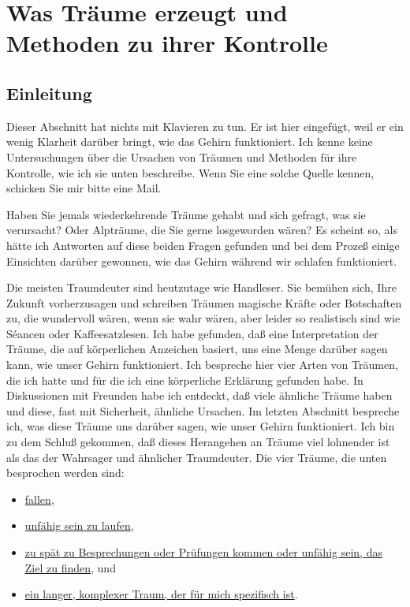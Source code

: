 
\section{Was Träume erzeugt und Methoden zu ihrer Kontrolle}
\label{c3_5}

\subsection{Einleitung}
\label{c3_5a}

Dieser Abschnitt hat nichts mit Klavieren zu tun.
Er ist hier eingefügt, weil er ein wenig Klarheit darüber bringt, wie das Gehirn funktioniert.
Ich kenne keine Untersuchungen über die Ursachen von Träumen und Methoden für ihre Kontrolle, wie ich sie unten beschreibe.
Wenn Sie eine solche Quelle kennen, schicken Sie mir bitte eine Mail.

Haben Sie jemals wiederkehrende Träume gehabt und sich gefragt, was sie verursacht?
Oder Alpträume, die Sie gerne losgeworden wären?
Es scheint so, als hätte ich Antworten auf diese beiden Fragen gefunden und bei dem Prozeß einige Einsichten darüber gewonnen, wie das Gehirn während wir schlafen funktioniert.

Die meisten Traumdeuter sind heutzutage wie Handleser.
Sie bemühen sich, Ihre Zukunft vorherzusagen und schreiben Träumen magische Kräfte oder Botschaften zu, die wundervoll wären, wenn sie wahr wären, aber leider so realistisch sind wie Séancen oder Kaffeesatzlesen.
Ich habe gefunden, daß eine Interpretation der Träume, die auf körperlichen Anzeichen basiert, uns eine Menge darüber sagen kann, wie unser Gehirn funktioniert.
Ich bespreche hier vier Arten von Träumen, die ich hatte und für die ich eine körperliche Erklärung gefunden habe.
In Diskussionen mit Freunden habe ich entdeckt, daß viele ähnliche Träume haben und diese, fast mit Sicherheit, ähnliche Ursachen.
Im letzten Abschnitt bespreche ich, was diese Träume uns darüber sagen, wie unser Gehirn funktioniert.
Ich bin zu dem Schluß gekommen, daß dieses Herangehen an Träume viel lohnender ist als das der Wahrsager und ähnlicher Traumdeuter.
Die vier Träume, die unten besprochen werden sind:

\begin{itemize} 
 \item \hyperref[c3_5b]{fallen},
 \item \hyperref[c3_5c]{unfähig sein zu laufen},
 \item \hyperref[c3_5d]{zu spät zu Besprechungen oder Prüfungen kommen oder unfähig sein, das Ziel zu finden}, und
 \item \hyperref[c3_5e]{ein langer, komplexer Traum, der für mich spezifisch ist}.
\end{itemize}

